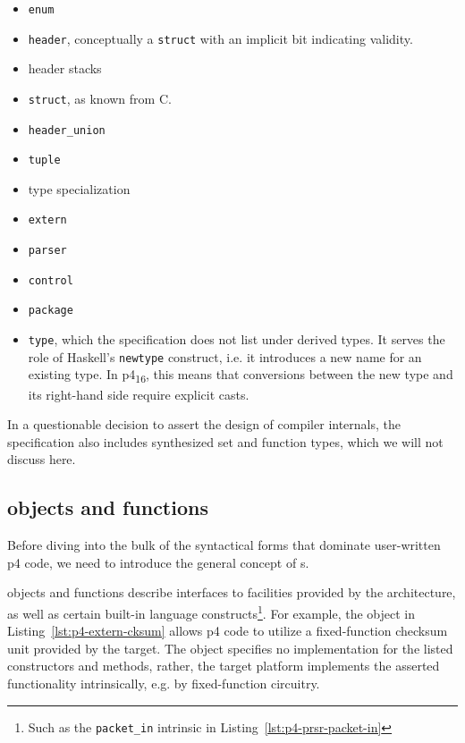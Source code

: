 \begin{itemize}
	\item \texttt{enum}
	\item \texttt{header}, conceptually a \texttt{struct} with an implicit bit
	indicating validity.
	\item header stacks
	\item \texttt{struct}, as known from C.
	\item \texttt{header\_union}
	\item \texttt{tuple}
	\item type specialization
	\item \texttt{extern}
	\item \texttt{parser}
	\item \texttt{control}
	\item \texttt{package}
	\item \texttt{type}, which the specification does not list under derived
	types. It serves the role of Haskell's \texttt{newtype} construct, i.e. it
	introduces a new name for an existing type. In
	\acrshort{p4}\textsubscript{16}, this means that conversions between the new
	type and its right-hand side require explicit casts.
\end{itemize}

In a questionable decision to assert the design of compiler internals, the
specification also includes synthesized set and function types, which we will
not discuss here.

\subsection*{\extern{} objects and functions}

Before diving into the bulk of the syntactical forms that dominate user-written
\acrshort{p4} code, we need to introduce the general concept of \extern{}s.

\extern{} objects and functions describe interfaces to facilities provided by
the architecture, as well as certain built-in language constructs\footnote{Such
as the \texttt{packet\_in} intrinsic in Listing~\ref{lst:p4-prsr-packet-in}}.
For example, the \extern{} object in Listing~\ref{lst:p4-extern-cksum} allows
\acrshort{p4} code to utilize a fixed-function checksum unit provided by the
target. The object specifies no implementation for the listed constructors and
methods, rather, the target platform implements the asserted functionality
intrinsically, e.g. by fixed-function circuitry.

